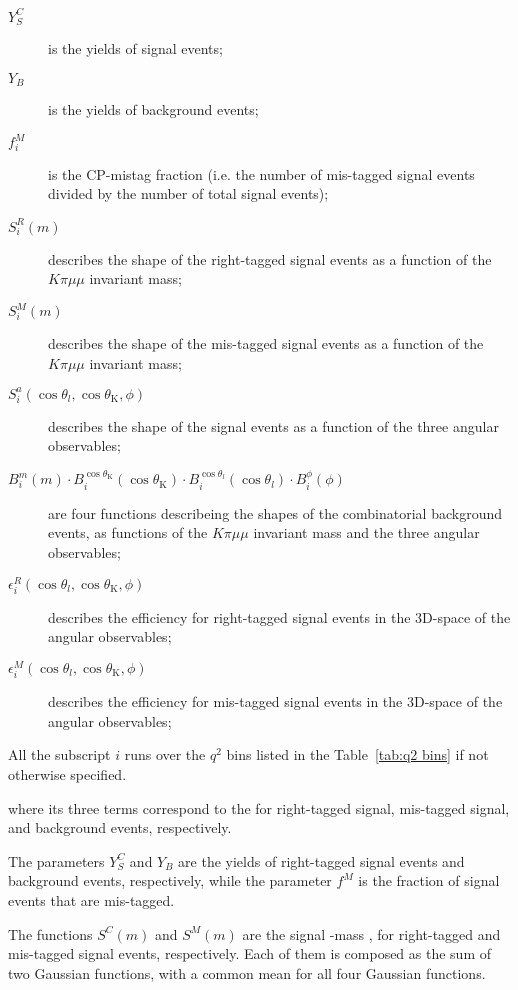 \begin{description}
    \item[$Y_{S}^C$] is the yields of signal events;
    \item[$Y_{B}$] is the yields of background events;
    \item[$f_i^M$] is the CP-mistag fraction (i.e. the number of mis-tagged signal events divided by the number of total signal events);
    \item[$S_i^R(m)$] describes the shape of the right-tagged signal events as a function of the $K\pi\mu\mu$ invariant mass;
    \item[$S_i^M(m)$] describes the shape of the mis-tagged signal events as a function of the $K\pi\mu\mu$ invariant mass;
    \item[$S_i^a(\cos\theta_l,\cos\theta_\mathrm{K},\phi)$] describes the shape of the signal events as a function of the three angular observables;
    \item[$B_i^m(m) \cdot B_i^{\cos\theta_\mathrm{K}}(\cos\theta_\mathrm{K}) \cdot B_i^{\cos\theta_l}(\cos\theta_l) \cdot B_i^{\phi}(\phi) $] are four functions describeing the shapes of the combinatorial background events, as functions of the $K\pi\mu\mu$ invariant mass and the three angular observables; 
    \item[$\epsilon_i^R(\cos\theta_l,\cos\theta_\mathrm{K},\phi)$] describes the efficiency for right-tagged signal events in the 3D-space of the angular observables;
    \item[$\epsilon_i^M(\cos\theta_l,\cos\theta_\mathrm{K},\phi)$] describes the efficiency for mis-tagged signal events in the 3D-space of the angular observables;
\end{description}

All the subscript $i$ runs over the $q^2$ bins listed in the Table~\ref{tab:q2 bins} if not otherwise specified.

where its three terms correspond to the \pdfs for right-tagged signal, mis-tagged signal, and background events, respectively.

The parameters $Y^{C}_{S}$ and $Y_{B}$ are the yields of right-tagged signal events and background events, respectively, while the parameter $f^{M}$ is the fraction of signal events that are mis-tagged.

The functions $S^{C}(m)$ and $S^{M}(m)$ are the signal \PBz-mass \pdfs, for right-tagged and mis-tagged signal events, respectively.
Each of them is composed as the sum of two Gaussian functions, with a common mean for all four Gaussian functions.

